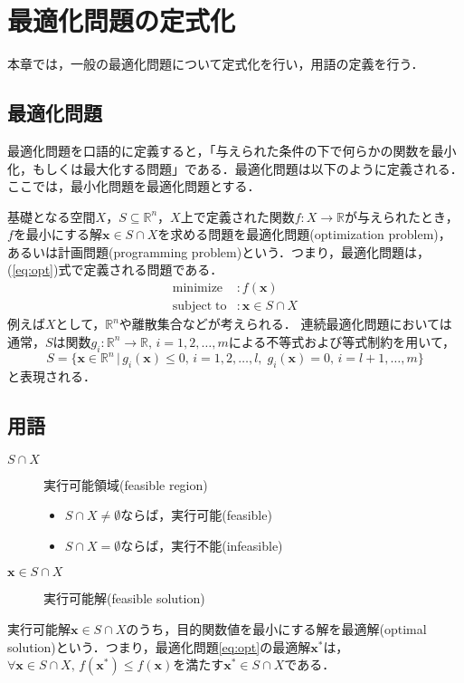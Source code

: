 \documentclass{jsreport}
\begin{document}
\chapter{最適化問題の定式化}
本章では，一般の最適化問題について定式化を行い，用語の定義を行う．
\section{最適化問題}
最適化問題を口語的に定義すると，「与えられた条件の下で何らかの関数を最小化，もしくは最大化する問題」である．最適化問題は以下のように定義される．ここでは，最小化問題を最適化問題とする．

基礎となる空間$X$，$S \subseteq \mathbb{R}^n$，$X$上で定義された関数$f: X \rightarrow \mathbb{R}$が与えられたとき，$f$を最小にする解$\bm{x} \in S \cap X$を求める問題を最適化問題(optimization problem)，あるいは計画問題(programming problem)という．つまり，最適化問題は，(\ref{eq:opt})式で定義される問題である．
\begin{align}\label{eq:opt}
  \mathrm{minimize} &: f(\bm{x}) \nonumber\\
  \mathrm{subject \; to} &: \bm{x} \in S \cap X
\end{align}
例えば$X$として，$\mathbb{R}^n$や離散集合などが考えられる．
連続最適化問題においては通常，$S$は関数$g_i: \mathbb{R}^n \rightarrow \mathbb{R}, \, i = 1, 2, \ldots, m$による不等式および等式制約を用いて，
\begin{equation}\label{eq:const}
  S = \{\bm{x} \in \mathbb{R}^n \, | \, g_i(\bm{x}) \leq 0, \, i = 1, 2, \ldots, l, \; g_i(\bm{x}) = 0, \, i = l + 1, \ldots, m\}
\end{equation}
と表現される．

\section{用語}
\begin{description}
  \item[$S \cap X$] 実行可能領域(feasible region)
  \begin{itemize}
    \item $S \cap X \neq \emptyset$ならば，実行可能(feasible)
    \item $S \cap X = \emptyset$ならば，実行不能(infeasible)
  \end{itemize}
  \item[$\bm{x} \in S \cap X$] 実行可能解(feasible solution)
\end{description}

実行可能解$\bm{x} \in S \cap X$のうち，目的関数値を最小にする解を最適解(optimal solution)という．つまり，最適化問題\ref{eq:opt}の最適解$\bm{x}^*$は，$\forall \bm{x} \in S \cap X, \, f(\bm{x}^*) \leq f(\bm{x})$を満たす$\bm{x}^* \in S \cap X$である．
\end{document}
